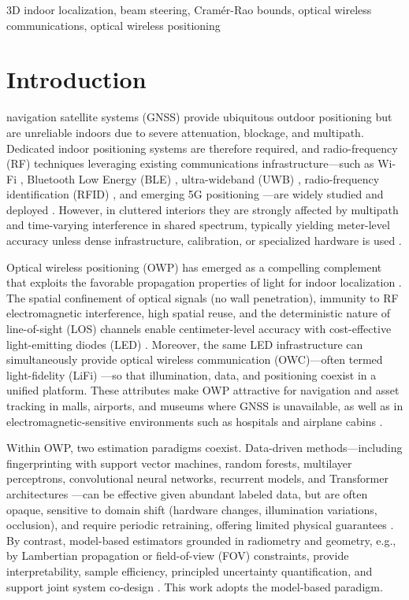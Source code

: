 \documentclass[journal]{IEEEtran}
\begin{document}
\begin{IEEEkeywords} 
    3D indoor localization, beam steering, Cramér-Rao bounds, optical wireless communications, optical wireless positioning
\end{IEEEkeywords}

\section{Introduction}

 navigation satellite systems (GNSS) provide ubiquitous outdoor positioning but are unreliable indoors due to severe attenuation, blockage, and multipath. Dedicated indoor positioning systems are therefore required, and radio-frequency (RF) techniques leveraging existing communications infrastructure---such as Wi-Fi \cite{He2016}, Bluetooth Low Energy (BLE) \cite{Faragher2015}, ultra-wideband (UWB) \cite{Alarifi2016}, radio-frequency identification (RFID) \cite{Ni2004}, and emerging 5G positioning \cite{Italiano2025}---are widely studied and deployed \cite{Zafari2019, Italiano2025}. However, in cluttered interiors they are strongly affected by multipath and time-varying interference in shared spectrum, typically yielding meter-level accuracy unless dense infrastructure, calibration, or specialized hardware is used \cite{Lymberopoulos2015, Leitch2023}.

Optical wireless positioning (OWP) has emerged as a compelling complement that exploits the favorable propagation properties of light for indoor localization \cite{Wang2024b}. The spatial confinement of optical signals (no wall penetration), immunity to RF electromagnetic interference, high spatial reuse, and the deterministic nature of line-of-sight (LOS) channels enable centimeter-level accuracy with cost-effective light-emitting diodes (LED) \cite{Trevlakis2023}. Moreover, the same LED infrastructure can simultaneously provide optical wireless communication (OWC)---often termed light-fidelity (LiFi) \cite{Haas:16}---so that illumination, data, and positioning coexist in a unified platform. These attributes make OWP attractive for navigation and asset tracking in malls, airports, and museums where GNSS is unavailable, as well as in electromagnetic-sensitive environments such as hospitals and airplane cabins \cite{Wang2024b, Zhu2025}.

Within OWP, two estimation paradigms coexist. Data-driven methods---including fingerprinting with support vector machines, random forests, multilayer perceptrons, convolutional neural networks, recurrent models, and Transformer architectures \cite{Rekkas2023, Tran2022}---can be effective given abundant labeled data, but are often opaque, sensitive to domain shift (hardware changes, illumination variations, occlusion), and require periodic retraining, offering limited physical guarantees \cite{Glass2021}. By contrast, model-based estimators grounded in radiometry and geometry, e.g., by Lambertian propagation or field-of-view (FOV) constraints, provide interpretability, sample efficiency, principled uncertainty quantification, and support joint system co-design \cite{Deng2023}. This work adopts the model-based paradigm.
\end{document}
